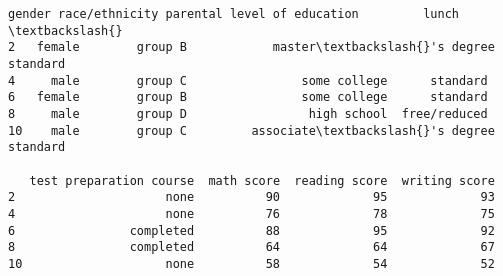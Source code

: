             \begin{tcolorbox}[breakable, size=fbox, boxrule=.5pt, pad at break*=1mm, opacityfill=0]
\begin{Verbatim}[commandchars=\\\{\}]
    gender race/ethnicity parental level of education         lunch  \textbackslash{}
2   female        group B            master\textbackslash{}'s degree      standard
4     male        group C                some college      standard
6   female        group B                some college      standard
8     male        group D                 high school  free/reduced
10    male        group C         associate\textbackslash{}'s degree      standard

   test preparation course  math score  reading score  writing score
2                     none          90             95             93
4                     none          76             78             75
6                completed          88             95             92
8                completed          64             64             67
10                    none          58             54             52
\end{Verbatim}
\end{tcolorbox}
